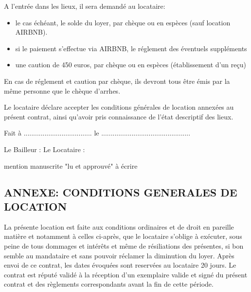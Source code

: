 \documentclass[a4paper,11pt]{article}
\begin{document}
\vspace{0.5cm}

A l'entrée dans les lieux, il sera demandé au locataire:
\begin{itemize}
\item le cas échéant, le solde du loyer, par chèque ou en espèces (sauf location AIRBNB).
\item si le paiement s'effectue via AIRBNB, le réglement des éventuels suppléments
\item une caution de 450 euros, par chèque ou en espèces (établissement d'un reçu)
\end{itemize}
En cas de réglement et caution par chèque, ils devront tous être émis par la même personne que le chèque d'arrhes.

\vspace{0.5cm}

Le locataire déclare accepter les conditions générales de location annexées au présent contrat, ainsi qu'avoir pris connaissance de l'état descriptif des lieux.

\vspace{0.5cm}

Fait à .................................... le ...............................................

\vspace{0.5cm}

Le Bailleur : \hspace{3cm}Le Locataire : 

\hspace{5.2cm}mention manuscrite "lu et approuvé" à écrire


\newpage{}




\begin{center}
\section*  { ANNEXE: CONDITIONS GENERALES  DE LOCATION}
\end{center}


\tiny



La présente location est faite aux conditions ordinaires et de droit en pareille matière et notamment à celles ci-après, que le locataire s’oblige à exécuter, sous peine de tous dommages et intérêts et même de résiliations des présentes, si bon semble au mandataire et sans pouvoir réclamer la diminution du loyer.
Après envoi de ce contrat, les dates évoquées sont reservées au locataire 20 jours. Le contrat est réputé validé à la réception d’un exemplaire valide et signé du présent contrat et des règlements correspondants avant la fin de cette période.
\end{document}
